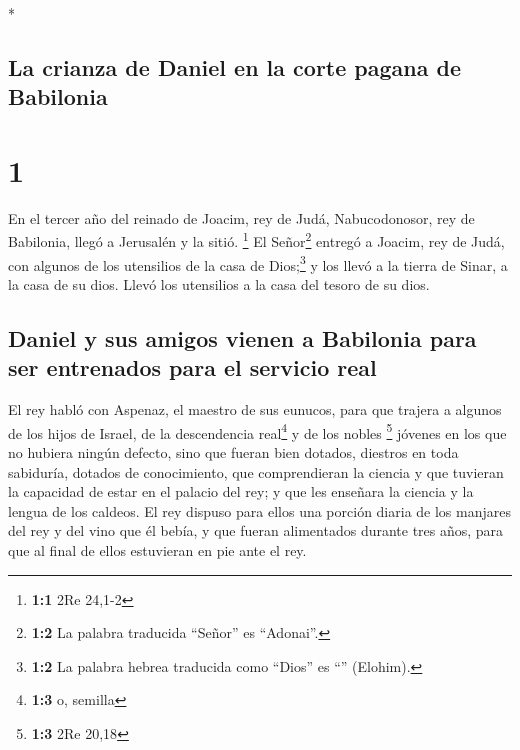 \begin{paracol}{2} \switchcolumn[0]*

\hypertarget{la-crianza-de-daniel-en-la-corte-pagana-de-babilonia}{%
\subsection{La crianza de Daniel en la corte pagana de
Babilonia}\label{la-crianza-de-daniel-en-la-corte-pagana-de-babilonia}}

\hypertarget{section}{%
\section{1}\label{section}}

 En el tercer año del reinado de Joacim, rey de Judá,
Nabucodonosor, rey de Babilonia, llegó a Jerusalén y la sitió.
\footnote{\textbf{1:1} 2Re 24,1-2}  El Señor\footnote{\textbf{1:2}
  La palabra traducida ``Señor'' es ``Adonai''.} entregó a Joacim, rey
de Judá, con algunos de los utensilios de la casa de Dios;\footnote{\textbf{1:2}
  La palabra hebrea traducida como ``Dios'' es ``''
  (Elohim).} y los llevó a la tierra de Sinar, a la casa de su dios.
Llevó los utensilios a la casa del tesoro de su dios.

\hypertarget{daniel-y-sus-amigos-vienen-a-babilonia-para-ser-entrenados-para-el-servicio-real}{%
\subsection{Daniel y sus amigos vienen a Babilonia para ser entrenados
para el servicio
real}\label{daniel-y-sus-amigos-vienen-a-babilonia-para-ser-entrenados-para-el-servicio-real}}

 El rey habló con Aspenaz, el maestro de sus eunucos, para
que trajera a algunos de los hijos de Israel, de la descendencia
real\footnote{\textbf{1:3} o, semilla} y de los nobles \footnote{\textbf{1:3}
  2Re 20,18}  jóvenes en los que no hubiera ningún
defecto, sino que fueran bien dotados, diestros en toda sabiduría,
dotados de conocimiento, que comprendieran la ciencia y que tuvieran la
capacidad de estar en el palacio del rey; y que les enseñara la ciencia
y la lengua de los caldeos.  El rey dispuso para ellos una
porción diaria de los manjares del rey y del vino que él bebía, y que
fueran alimentados durante tres años, para que al final de ellos
estuvieran en pie ante el rey.


\end{paracol}
